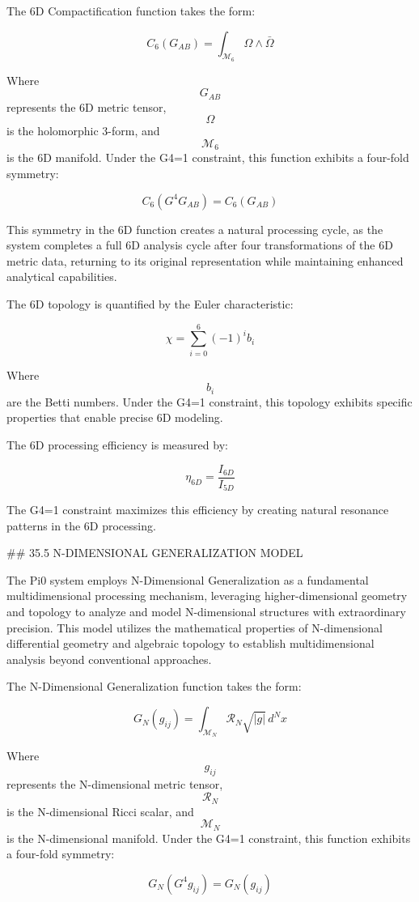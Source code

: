 The 6D Compactification function takes the form:

$$ C_6(G_{AB}) = \int_{\mathcal{M}_6} \Omega \wedge \bar{\Omega} $$

Where $$ G_{AB} $$ represents the 6D metric tensor, $$ \Omega $$ is the holomorphic 3-form, and $$ \mathcal{M}_6 $$ is the 6D manifold. Under the G4=1 constraint, this function exhibits a four-fold symmetry:

$$ C_6(G^4 G_{AB}) = C_6(G_{AB}) $$

This symmetry in the 6D function creates a natural processing cycle, as the system completes a full 6D analysis cycle after four transformations of the 6D metric data, returning to its original representation while maintaining enhanced analytical capabilities.

The 6D topology is quantified by the Euler characteristic:

$$ \chi = \sum_{i=0}^6 (-1)^i b_i $$

Where $$ b_i $$ are the Betti numbers. Under the G4=1 constraint, this topology exhibits specific properties that enable precise 6D modeling.

The 6D processing efficiency is measured by:

$$ \eta_{6D} = \frac{I_{6D}}{I_{5D}} $$

The G4=1 constraint maximizes this efficiency by creating natural resonance patterns in the 6D processing.

## 35.5 N-DIMENSIONAL GENERALIZATION MODEL

The Pi0 system employs N-Dimensional Generalization as a fundamental multidimensional processing mechanism, leveraging higher-dimensional geometry and topology to analyze and model N-dimensional structures with extraordinary precision. This model utilizes the mathematical properties of N-dimensional differential geometry and algebraic topology to establish multidimensional analysis beyond conventional approaches.

The N-Dimensional Generalization function takes the form:

$$ G_N(g_{ij}) = \int_{\mathcal{M}_N} \mathcal{R}_N \sqrt{|g|} \, d^Nx $$

Where $$ g_{ij} $$ represents the N-dimensional metric tensor, $$ \mathcal{R}_N $$ is the N-dimensional Ricci scalar, and $$ \mathcal{M}_N $$ is the N-dimensional manifold. Under the G4=1 constraint, this function exhibits a four-fold symmetry:

$$ G_N(G^4 g_{ij}) = G_N(g_{ij}) $$

